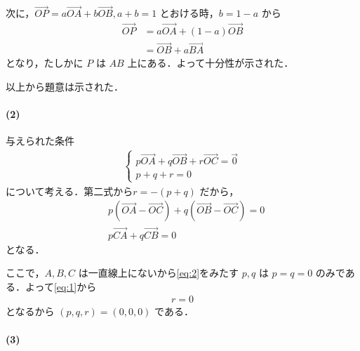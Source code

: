 \documentclass[../../main.tex]{subfiles}
\begin{document}
次に，$\overrightarrow{OP} = a\overrightarrow{OA} + b\overrightarrow{OB}, a+b=1$ とおける時，$b=1-a$ から
\begin{align}
  \overrightarrow{OP} &= a\overrightarrow{OA} + (1-a)\overrightarrow{OB} \\
  &= \overrightarrow{OB} + a\overrightarrow{BA}
\end{align}
となり，たしかに $P$ は $AB$ 上にある．よって十分性が示された．

以上から題意は示された．

\paragraph{(2)}

与えられた条件
\begin{align}
  \begin{cases}
    p\overrightarrow{OA}+q\overrightarrow{OB}+r\overrightarrow{OC}=\vec{0} \\
    p+q+r=0
  \end{cases} \label{eq:1}
\end{align}
について考える．第二式から$r=-(p+q)$ だから，
\begin{align}
  & p(\overrightarrow{OA} - \overrightarrow{OC}) + q(\overrightarrow{OB} - \overrightarrow{OC}) = 0 \\
  & p\overrightarrow{CA} + q\overrightarrow{CB} = 0 \label{eq:2}
\end{align}
となる．

ここで，$A, B, C$ は一直線上にないから\cref{eq:2}をみたす $p, q$ は $p=q=0$ のみである．よって\cref{eq:1}から
\begin{align}
  r = 0
\end{align}
となるから $(p, q, r) = (0, 0, 0)$ である．

\paragraph{(3)}
\end{document}
